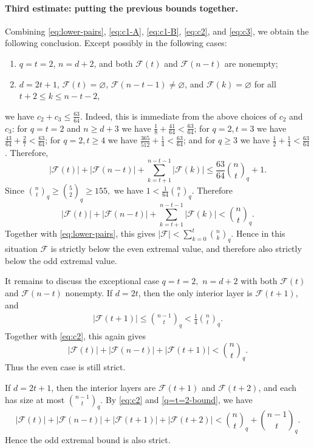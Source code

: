 \documentclass[11pt]{article}
\theoremstyle{definition}
\newcommand{\qbinom}[2]{\genfrac{(}{)}{0pt}{}{#1}{#2}_q}
\begin{document}
\paragraph{Third estimate: putting the previous bounds together.}
Combining \eqref{eq:lower-pairs}, \eqref{eq:c1-A}, \eqref{eq:c1-B}, \eqref{eq:c2}, and \eqref{eq:c3}, we obtain the following conclusion.  Except possibly in the following cases:
\begin{enumerate}
\item[\textup{(1)}]
$q=t=2$, $n=d+2$, and both $\mathcal F(t)$ and $\mathcal F(n-t)$ are nonempty;

\item[\textup{(2)}]
\(d=2t+1\), \(\mathcal F(t)=\varnothing\),
\(\mathcal F(n-t-1)\neq\varnothing\), and
\(\mathcal F(k)=\varnothing\) for all \(t+2\le k\le n-t-2\),
\end{enumerate}
we have
\(
c_2+c_3\le \frac{63}{64}.
\)
Indeed, this is immediate from the above choices of \(c_2\) and \(c_3\): for \(q=t=2\) and \(n\ge d+3\) we have \(\frac18+\frac{41}{64}<\frac{63}{64}\); for \(q=2,t=3\) we have \(\frac{43}{64}+\frac{2}{7}<\frac{63}{64}\); for \(q=2,t\ge4\) we have \(\frac{365}{512}+\frac{1}{4}<\frac{63}{64}\); and for \(q\ge3\) we have \(\frac{1}{2}+\frac{1}{4}<\frac{63}{64}\).
Therefore,
\[
|\mathcal F(t)|+|\mathcal F(n-t)|+
\sum_{k=t+1}^{n-t-1}|\mathcal F(k)|
\le
\frac{63}{64}\qbinom{n}{t}+1.
\]
Since
\(
\qbinom{n}{t}\ge \qbinom{5}{2}\ge 155,
\)
we have
\(
1<\frac1{64}\qbinom{n}{t}.
\)
Therefore
\[
|\mathcal F(t)|+|\mathcal F(n-t)|+
\sum_{k=t+1}^{n-t-1}|\mathcal F(k)|
<
\qbinom{n}{t}.
\]
Together with \eqref{eq:lower-pairs}, this gives
\(
|\mathcal F|
<
\sum_{k=0}^{t}\qbinom{n}{k}.
\)
Hence in this situation $\mathcal F$ is strictly below the even extremal value, and therefore also strictly below the odd extremal value.

It remains to discuss the exceptional case
\(
q=t=2,\) \( n=d+2\)
with both $\mathcal F(t)$ and $\mathcal F(n-t)$ nonempty. 
If $d=2t$, then the only interior layer is $\mathcal F(t+1)$, and
\begin{align}\label{q=t=2-bound}
|\mathcal F(t+1)|\le \qbinom{n-1}{t}<\frac14\qbinom{n}{t}.  
\end{align}
Together with \eqref{eq:c2}, this again gives
\[
|\mathcal F(t)|+|\mathcal F(n-t)|+|\mathcal F(t+1)|
<
\qbinom{n}{t}.
\]
Thus the even case is still strict.

If $d=2t+1$, then the interior layers are $\mathcal F(t+1)$ and $\mathcal F(t+2)$, and each has size at most $\qbinom{n-1}{t}$. 
By \eqref{eq:c2} and \eqref{q=t=2-bound}, we have
\[
|\mathcal F(t)|+|\mathcal F(n-t)|+|\mathcal F(t+1)|+|\mathcal F(t+2)|
<
\qbinom{n}{t}+\qbinom{n-1}{t}.
\]
Hence the odd extremal bound is also strict.
\end{document}
